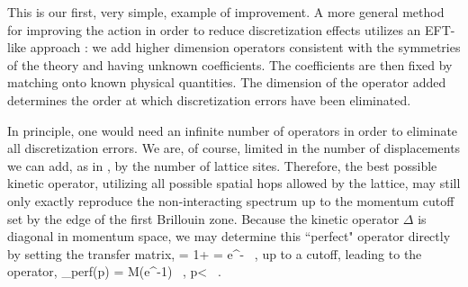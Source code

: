 This is our first, very simple, example of improvement. A more general method for improving the action in order to reduce discretization effects utilizes an EFT-like approach \cite{Symanzik1,Symanzik2,Symanzik3,Symanzik4,EKLN4}: we add higher dimension operators consistent with the symmetries of the theory and having unknown coefficients. The coefficients are then fixed by matching onto known physical quantities. The dimension of the operator added determines the order at which discretization errors have been eliminated.

In principle, one would need an infinite number of operators in order to eliminate all discretization errors. We are, of course, limited in the number of displacements we can add, as in , by the number of lattice sites. Therefore, the best possible kinetic operator, utilizing all possible spatial hops allowed by the lattice, may still only exactly reproduce the non-interacting spectrum up to the momentum cutoff set by the edge of the first Brillouin zone. Because the kinetic operator $\Delta$ is diagonal in momentum space, we may determine this ``perfect" operator directly by setting the transfer matrix,
\beq
{}= 1+ = e^{-} \ ,
\eeq
up to a cutoff, leading to the operator,
\beq
\label{eq:perfect}
\Delta_{\mbox{\tiny perf}}(p) = M\left(e^{}-1\right) \ , \qquad p<  \ .
\eeq

